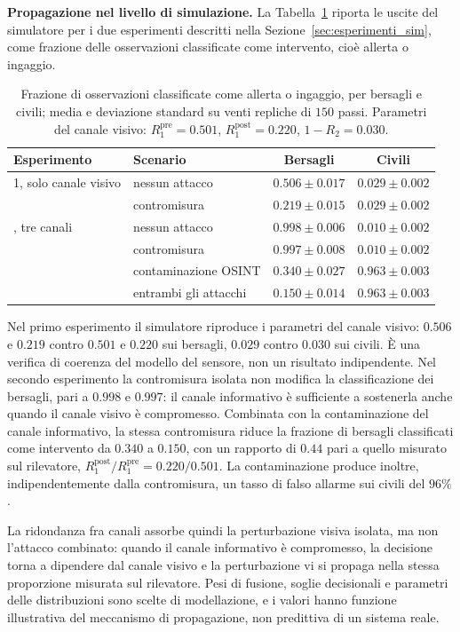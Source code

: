 \ifstampa\documentclass[a4paper,12pt,twoside,openright]{report}\else\documentclass[a4paper,12pt]{report}\fi
\newif\ifrevisione \revisionefalse
\DeclareRobustCommand{\rev}[1]{\ifrevisione{\color{blue!65!black}#1}\else#1\fi}
\begin{document}
\rev{\textbf{Propagazione nel livello di simulazione.}
\label{sec:risultato_simulatore}
La Tabella~\ref{tab:simulatore} riporta le uscite del simulatore per i due
esperimenti descritti nella Sezione~\ref{sec:esperimenti_sim}, come frazione
delle osservazioni classificate come intervento, cioè allerta o ingaggio.

\begin{table}[t]
\centering
\begin{tabular}{llcc}
\toprule
Esperimento & Scenario & Bersagli & Civili \\
\midrule
1, solo canale visivo & nessun attacco & $0.506 \pm 0.017$ & $0.029 \pm 0.002$ \\
 & contromisura & $0.219 \pm 0.015$ & $0.029 \pm 0.002$ \\
\addlinespace
2, tre canali & nessun attacco & $0.998 \pm 0.006$ & $0.010 \pm 0.002$ \\
 & contromisura & $0.997 \pm 0.008$ & $0.010 \pm 0.002$ \\
 & contaminazione OSINT & $0.340 \pm 0.027$ & $0.963 \pm 0.003$ \\
 & entrambi gli attacchi & $0.150 \pm 0.014$ & $0.963 \pm 0.003$ \\
\bottomrule
\end{tabular}
\caption[Uscite del livello di simulazione]{\rev{Frazione di osservazioni classificate come allerta o ingaggio, per
bersagli e civili; media e deviazione standard su venti repliche di $150$
passi. Parametri del canale visivo: $R_1^{\text{pre}} = 0.501$,
$R_1^{\text{post}} = 0.220$, $1 - R_2 = 0.030$.}}
\label{tab:simulatore}
\end{table}

Nel primo esperimento il simulatore riproduce i parametri del canale visivo:
$0.506$ e $0.219$ contro $0.501$ e $0.220$ sui bersagli, $0.029$ contro
$0.030$ sui civili. È una verifica di coerenza del modello del sensore, non un
risultato indipendente. Nel secondo esperimento la contromisura isolata non
modifica la classificazione dei bersagli, pari a $0.998$ e $0.997$: il canale
informativo è sufficiente a sostenerla anche quando il canale visivo è
compromesso. Combinata con la contaminazione del canale informativo, la stessa
contromisura riduce la frazione di bersagli classificati come intervento da
$0.340$ a $0.150$, con un rapporto di $0.44$ pari a quello misurato sul
rilevatore, $R_1^{\text{post}}/R_1^{\text{pre}} = 0.220/0.501$. La
contaminazione produce inoltre, indipendentemente dalla contromisura, un tasso
di falso allarme sui civili del $96\%$.

La ridondanza fra canali assorbe quindi la perturbazione visiva isolata, ma
non l'attacco combinato: quando il canale informativo è compromesso, la
decisione torna a dipendere dal canale visivo e la perturbazione vi si propaga
nella stessa proporzione misurata sul rilevatore. Pesi di fusione, soglie
decisionali e parametri delle distribuzioni sono scelte di modellazione, e i
valori hanno funzione illustrativa del meccanismo di propagazione, non
predittiva di un sistema reale.}
\end{document}
